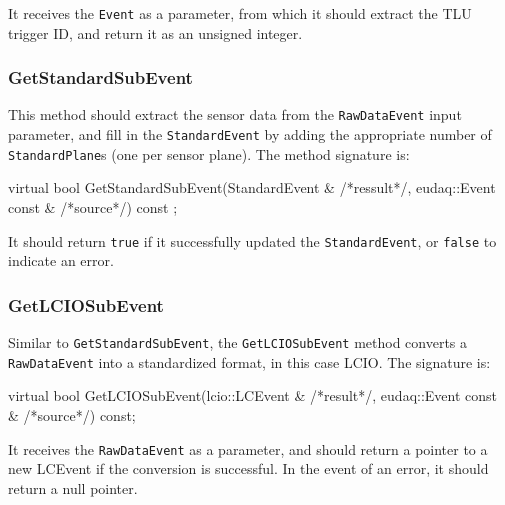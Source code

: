 It receives the \texttt{Event} as a parameter, from which it should extract the \gls{TLU} trigger ID,
and return it as an unsigned integer.

\subsubsection{GetStandardSubEvent}
This method should extract the sensor data from the \texttt{RawDataEvent} input parameter,
and fill in the \texttt{StandardEvent} by adding the appropriate number of \texttt{StandardPlane}s
(one per sensor plane).
The method signature is:
\begin{listing}
virtual bool GetStandardSubEvent(StandardEvent & /*ressult*/,
                                     eudaq::Event const & /*source*/) const ;
\end{listing}

It should return \texttt{true} if it successfully updated the \texttt{StandardEvent}, or \texttt{false} to indicate an error.

\subsubsection{GetLCIOSubEvent}
Similar to \texttt{GetStandardSubEvent}, the \texttt{GetLCIOSubEvent} method converts a \texttt{RawDataEvent}
into a standardized format, in this case \gls{LCIO}.
The signature is:
\begin{listing}
virtual bool GetLCIOSubEvent(lcio::LCEvent & /*result*/,
				eudaq::Event const & /*source*/) const;
\end{listing}

It receives the \texttt{RawDataEvent} as a parameter, and should return a pointer to a new LCEvent
if the conversion is successful. In the event of an error, it should return a null pointer.
